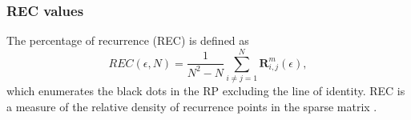 \documentclass[fleqn,10pt]{wlscirep}
\begin{document}
\subsubsection*{REC values}
The percentage of recurrence (REC) is defined as
\begin{equation}
REC(\epsilon,N) = 
		\frac{1}{N^2 - N} \sum^{N}_{i \neq j = 1} 
		\mathbf{R}^{m}_{i,j}(\epsilon),
\end{equation}
which enumerates the black dots in the RP excluding the line of identity.
REC is a measure of the relative density of recurrence points in the sparse 
matrix \cite{marwan2015}.
\end{document}
